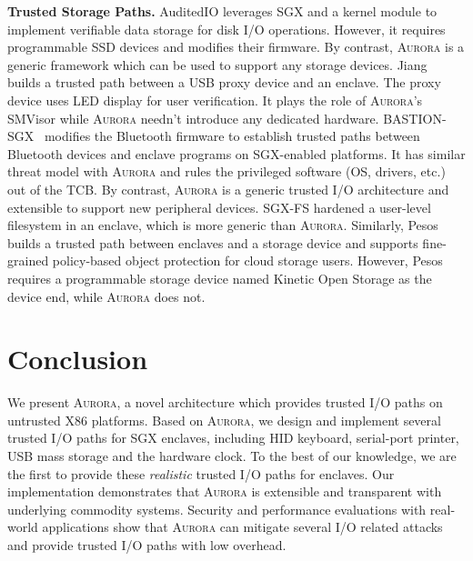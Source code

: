 \textbf{Trusted Storage Paths.}
AuditedIO \cite{DBLP:conf/apsys/BalakrishnanCBS17} leverages SGX and a kernel module to implement verifiable data storage for disk I/O operations. However, it requires programmable SSD devices and modifies their firmware.
By contrast, \textsc{Aurora} is a generic framework which can be used to support any storage devices. %
Jiang~\cite{Jang2017Building} builds a trusted path between a USB proxy device and an enclave. The proxy device uses LED display for user verification. It plays the role of  \textsc{Aurora}'s SMVisor while \textsc{Aurora} needn't introduce any dedicated hardware. %
BASTION-SGX~\cite{DBLP:conf/isca/PetersLVPK18} modifies the Bluetooth firmware to establish trusted  paths between Bluetooth  devices and enclave programs on SGX-enabled platforms. It has similar threat model with \textsc{Aurora} and rules the privileged software (OS, drivers, etc.) out of the TCB. %
By contrast, \textsc{Aurora} is a generic trusted I/O architecture and extensible to support new peripheral devices. %
SGX-FS \cite{DBLP:conf/cloudcom/BurihabwaFMS18} hardened a user-level filesystem in an enclave, which is more generic than \textsc{Aurora}. Similarly, Pesos~\cite{DBLP:conf/eurosys/KrahnTVKBF18} builds a trusted path between enclaves and a storage device and supports fine-grained policy-based object protection for cloud storage users. However, Pesos requires a programmable storage device named Kinetic Open Storage as the device end, while \textsc{Aurora} does not.

\section{Conclusion}

We present \textsc{Aurora}, a novel architecture which provides trusted I/O paths on untrusted X86 platforms. Based on \textsc{Aurora}, we design and implement several trusted I/O paths for SGX enclaves, including HID keyboard, serial-port printer, USB mass storage and the hardware clock. To the best of our knowledge, we are the first to provide these \emph{realistic} trusted I/O paths for enclaves. Our implementation demonstrates that \textsc{Aurora} is extensible and transparent with underlying commodity systems. Security and performance evaluations with real-world applications show that \textsc{Aurora} can mitigate several I/O related attacks and provide trusted I/O paths with low overhead.

